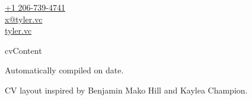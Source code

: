 \documentclass[11pt]{article}
\begin{document}
\hspace*{-1in}

\begin{minipage}[t]{5.1in}
  \vspace{-0.48in}
  \flushright
  \footnotesize
  \href{tel:12067394741}{+1 206-739-4741} \\
  \href{mailto:x@tyler.vc}{x@tyler.vc} \\
  \href{https://tyler.vc/}{tyler.vc}
  \vspace{0.2in}
\end{minipage}
\medskip

{{cvContent}}

\medskip

\hspace*{-1in} Automatically compiled on {{date}}.

\hspace*{-1in} CV layout inspired by Benjamin Mako Hill and Kaylea Champion.
\end{document}
